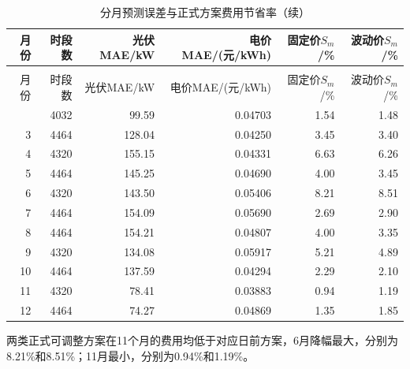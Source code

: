 \Needspace{0.35\textheight}
\begin{longtable}{rrrrrr}
\caption{分月预测误差与正式方案费用节省率}\label{tab:monthly_stability}\\
\toprule 月份 & 时段数 & 光伏MAE/kW & 电价MAE/(元/kWh) & 固定价$S_m$/\% & 波动价$S_m$/\%\\\midrule\endfirsthead
\caption{分月预测误差与正式方案费用节省率（续）}\\\toprule 月份 & 时段数 & 光伏MAE/kW & 电价MAE/(元/kWh) & 固定价$S_m$/\% & 波动价$S_m$/\%\\\midrule\endhead\bottomrule\endfoot
2 & 4032 & 99.59 & 0.04703 & 1.54 & 1.48\\
3 & 4464 & 128.04 & 0.04250 & 3.45 & 3.40\\
4 & 4320 & 155.15 & 0.04331 & 6.63 & 6.26\\
5 & 4464 & 145.25 & 0.04690 & 4.00 & 3.45\\
6 & 4320 & 143.50 & 0.05406 & 8.21 & 8.51\\
7 & 4464 & 154.09 & 0.05690 & 2.69 & 2.90\\
8 & 4464 & 154.21 & 0.04807 & 4.00 & 3.35\\
9 & 4320 & 134.08 & 0.05917 & 5.21 & 4.89\\
10 & 4464 & 137.59 & 0.04294 & 2.29 & 2.10\\
11 & 4320 & 78.41 & 0.03883 & 0.94 & 1.19\\
12 & 4464 & 74.27 & 0.04869 & 1.35 & 1.85\\

\end{longtable}
两类正式可调整方案在11个月的费用均低于对应日前方案，6月降幅最大，分别为8.21\%和8.51\%；11月最小，分别为0.94\%和1.19\%。


